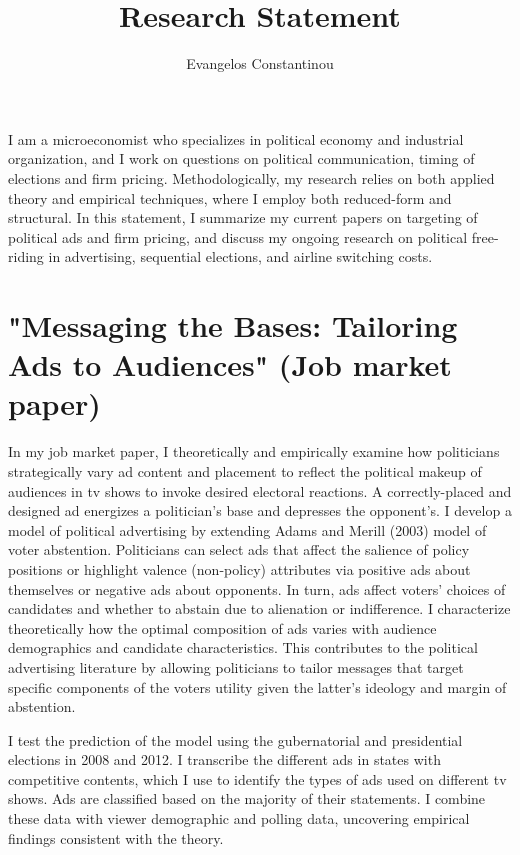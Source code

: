 \documentclass[12pt]{article}
\author{Evangelos Constantinou}
\date{}
\title{\bf{Research Statement}}
\begin{document}
\maketitle
I am a microeconomist who specializes in political economy and industrial organization, and I work on questions on political communication, timing of elections and firm pricing.
Methodologically, my research relies on both applied theory and empirical techniques, where I employ both reduced-form and structural.
In this statement, I summarize my current papers on targeting of political ads and firm pricing, and discuss my ongoing research on political free-riding in advertising, sequential elections, and airline switching costs.

\vspace{0.25cm}
\section{"Messaging the Bases: Tailoring Ads to Audiences" (Job market paper)}
\label{sec:orgd4af66e}
\vspace{0.1cm}

\noindent
In my job market paper, I theoretically and empirically examine how politicians strategically vary ad content and placement to reflect the political makeup of audiences in tv shows to invoke desired electoral reactions.
A correctly-placed and designed ad energizes a politician's base and depresses the opponent's.
I develop a model of political advertising by extending Adams and Merill (2003) model of voter abstention.
Politicians can select ads that affect the salience of policy positions or highlight valence (non-policy) attributes via positive ads about themselves or negative ads about opponents.
In turn, ads affect voters’ choices of candidates and whether to abstain due to alienation or indifference.
I characterize theoretically how the optimal composition of ads varies with audience demographics and candidate characteristics.
This contributes to the political advertising literature by allowing politicians to tailor messages that target specific components of the voters utility given the latter's ideology and margin of abstention.

I test the prediction of the model using the gubernatorial and presidential elections in 2008 and 2012.
I transcribe the different ads in states with competitive contents, which I use to identify the types of ads used on different tv shows.
Ads are classified based on the majority of their statements.
I combine these data with viewer demographic and polling data, uncovering empirical findings consistent with the theory.
\end{document}
